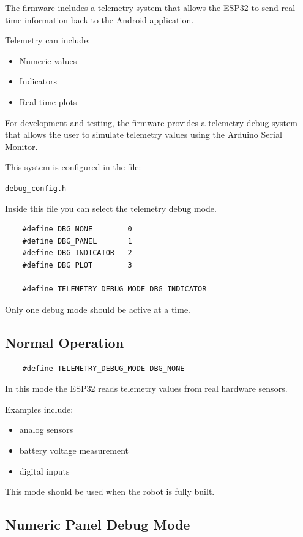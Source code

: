The firmware includes a telemetry system that allows the ESP32 to send
real-time information back to the Android application.

Telemetry can include:

\begin{itemize}
	\item Numeric values
	\item Indicators
	\item Real-time plots
\end{itemize}

For development and testing, the firmware provides a telemetry debug
system that allows the user to simulate telemetry values using the
Arduino Serial Monitor.

This system is configured in the file:

\begin{center}
	\texttt{debug\_config.h}
\end{center}

Inside this file you can select the telemetry debug mode.

\begin{verbatim}
	#define DBG_NONE        0
	#define DBG_PANEL       1
	#define DBG_INDICATOR   2
	#define DBG_PLOT        3

	#define TELEMETRY_DEBUG_MODE DBG_INDICATOR
\end{verbatim}

Only one debug mode should be active at a time.

\subsection{Normal Operation}

\begin{verbatim}
	#define TELEMETRY_DEBUG_MODE DBG_NONE
\end{verbatim}

In this mode the ESP32 reads telemetry values from real hardware sensors.

Examples include:

\begin{itemize}
	\item analog sensors
	\item battery voltage measurement
	\item digital inputs
\end{itemize}

This mode should be used when the robot is fully built.

\subsection{Numeric Panel Debug Mode}

